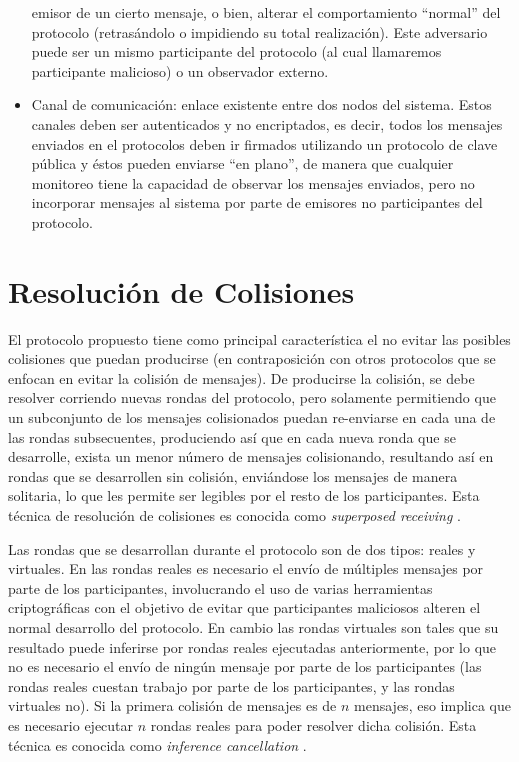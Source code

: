 \begin{itemize}
    emisor de un cierto mensaje, o bien, alterar el comportamiento ``normal'' 
    del protocolo (retrasándolo o impidiendo su total realización). Este 
    adversario puede ser un mismo participante del protocolo (al cual 
    llamaremos participante malicioso) o un observador externo.
    \item Canal de comunicación: enlace existente entre dos nodos del 
    sistema. Estos canales deben ser autenticados y no encriptados, es decir, 
    todos los mensajes enviados en el protocolos deben ir firmados utilizando 
    un protocolo de clave pública y éstos pueden enviarse ``en plano'', de 
    manera que cualquier monitoreo tiene la capacidad de observar los mensajes 
    enviados, pero no incorporar mensajes al sistema por parte de emisores no 
    participantes del protocolo.
\end{itemize}

\section{Resolución de Colisiones}

El protocolo propuesto tiene como principal característica el no evitar las 
posibles colisiones que puedan producirse (en contraposición con otros 
protocolos que se enfocan en evitar la colisión de mensajes). De producirse la 
colisión, se debe resolver corriendo nuevas rondas del protocolo, pero 
solamente permitiendo que un subconjunto de los mensajes colisionados puedan 
re-enviarse en cada una de las rondas subsecuentes, produciendo así que en 
cada nueva ronda que se desarrolle, exista un menor número de mensajes 
colisionando, resultando así en rondas que se desarrollen sin colisión, 
enviándose los mensajes de manera solitaria, lo que les permite ser legibles 
por el resto de los participantes. Esta técnica de resolución de colisiones es 
conocida como \emph{superposed receiving} \cite{franck2014dining}.

Las rondas que se desarrollan durante el protocolo son de dos tipos: reales y 
virtuales. En las rondas reales es necesario el envío de múltiples mensajes 
por parte de los participantes, involucrando el uso de varias herramientas 
criptográficas con el objetivo de evitar que participantes maliciosos alteren 
el normal desarrollo del protocolo. En cambio las rondas virtuales son tales 
que su resultado puede inferirse por rondas reales ejecutadas anteriormente, 
por lo que no es necesario el envío de ningún mensaje por parte de los 
participantes (las rondas reales cuestan trabajo por parte de los 
participantes, y las rondas virtuales no). Si la primera colisión de mensajes 
es de $n$ mensajes, eso implica que es necesario ejecutar $n$ rondas reales 
para poder resolver dicha colisión. Esta técnica es conocida como 
\emph{inference cancellation} \cite{yu2005sicta}.

